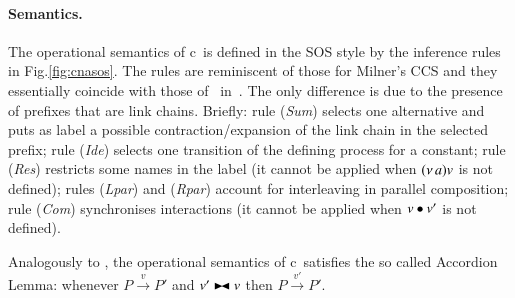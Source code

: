 \paragraph{Semantics.}

The operational semantics of c\CNA\ is defined in the SOS style by the inference rules in Fig.\ref{fig:cnasos}. The rules are reminiscent of those for Milner's CCS and they essentially coincide with those of \CNA\ in~\cite{BBB17}. The only difference is due to the presence of prefixes that are link chains.
Briefly: rule (\textit{Sum}) selects one alternative and puts as label a possible contraction/expansion of the link chain in the selected prefix; rule (\textit{Ide}) selects one transition of the defining process for a constant; rule (\textit{Res}) restricts some names in the label (it cannot be applied when $(\nu\, a)v$ is not defined); rules (\textit{Lpar}) and (\textit{Rpar}) account for interleaving in parallel composition; rule (\textit{Com}) 
synchronises interactions (it cannot be applied when $v \bullet v'$ is not defined).

Analogously to \CNA, the operational semantics of c\CNA\ satisfies the so called Accordion Lemma: whenever $P \xrightarrow{v} P'$ and $v'\blackstretcheq v$ then $P \xrightarrow{v'} P'$.


